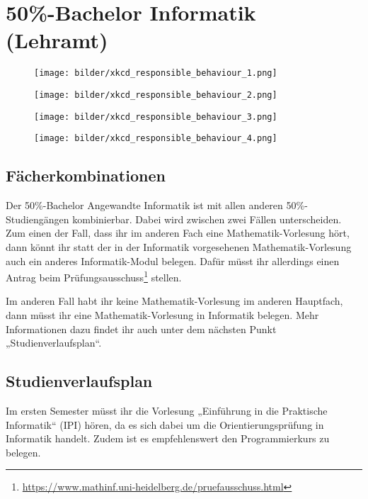 \section{50\%-Bachelor Informatik (Lehramt)}

\begin{figure*}[b]
    \centering
    \begin{subfigure}{.24\textwidth}
    		\centering
		\texttt{[image: bilder/xkcd\_responsible\_behaviour\_1.png]}
    \end{subfigure}
    \begin{subfigure}{.24\textwidth}
	    \centering
	    \texttt{[image: bilder/xkcd\_responsible\_behaviour\_2.png]}
    \end{subfigure}
    \begin{subfigure}{.25\textwidth}
	    \centering
	    \texttt{[image: bilder/xkcd\_responsible\_behaviour\_3.png]}
    \end{subfigure}
    \begin{subfigure}{.25\textwidth}
	    \centering
	    \texttt{[image: bilder/xkcd\_responsible\_behaviour\_4.png]}
    \end{subfigure}
\end{figure*}

\subsection{Fächerkombinationen}
Der 50\%-Bachelor Angewandte Informatik ist mit allen anderen 50\%-Studiengängen kombinierbar. Dabei wird zwischen zwei Fällen unterscheiden. Zum einen der Fall, dass ihr im anderen Fach eine Mathematik-Vorlesung hört, dann könnt ihr statt der in der Informatik vorgesehenen Mathematik-Vorlesung auch ein anderes Informatik-Modul belegen. Dafür müsst ihr allerdings einen Antrag beim Prüfungsausschuss\footnote{\url{https://www.mathinf.uni-heidelberg.de/pruefausschuss.html}} stellen. 

Im anderen Fall habt ihr keine Mathematik-Vorlesung im anderen Hauptfach, dann müsst ihr eine Mathematik-Vorlesung in Informatik belegen. Mehr Informationen dazu findet ihr auch unter dem nächsten Punkt „Studienverlaufsplan“.

\subsection{Studienverlaufsplan}
Im ersten Semester müsst ihr die Vorlesung „Einführung in die Praktische Informatik“ (\gls{IPI}) hören, da es sich dabei um die Orientierungsprüfung in Informatik handelt. Zudem ist es empfehlenswert den Programmierkurs zu belegen. 

